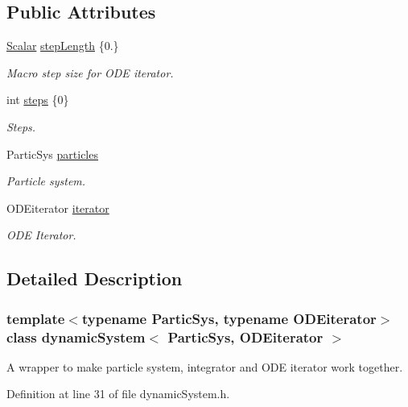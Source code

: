 \subsection*{Public Attributes}
\begin{DoxyCompactItemize}
\item 
\mbox{\hyperlink{classdynamic_system_a6eb7b06a4ee5721a1ee0855a854c3431}{Scalar}} \mbox{\hyperlink{classdynamic_system_a3f0e5b7ef17b728c723c67aefa9dbada}{step\+Length}} \{0.\}
\begin{DoxyCompactList}\small\item\em Macro step size for O\+DE iterator. \end{DoxyCompactList}\item 
int \mbox{\hyperlink{classdynamic_system_ae9821e179896e6cddbbcc4e706552c57}{steps}} \{0\}
\begin{DoxyCompactList}\small\item\em Steps. \end{DoxyCompactList}\item 
Partic\+Sys \mbox{\hyperlink{classdynamic_system_a809657c0ef63741a7e3d6f32bc87bfe3}{particles}}
\begin{DoxyCompactList}\small\item\em Particle system. \end{DoxyCompactList}\item 
O\+D\+Eiterator \mbox{\hyperlink{classdynamic_system_a0a13a11664ce5761ab4296b1b0421f99}{iterator}}
\begin{DoxyCompactList}\small\item\em O\+DE Iterator. \end{DoxyCompactList}\end{DoxyCompactItemize}


\subsection{Detailed Description}
\subsubsection*{template$<$typename Partic\+Sys, typename O\+D\+Eiterator$>$\newline
class dynamic\+System$<$ Partic\+Sys, O\+D\+Eiterator $>$}

A wrapper to make particle system, integrator and O\+DE iterator work together. 

Definition at line 31 of file dynamic\+System.\+h.



